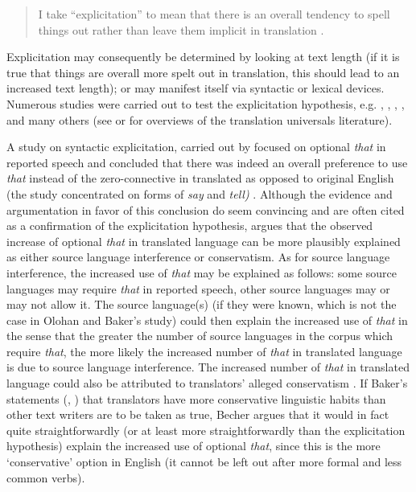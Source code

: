 \begin{quote}
I take “explicitation” to mean that there is an overall tendency to spell things out rather than leave them implicit in translation \citep[180]{baker_corpus-based_1996}.
\end{quote}

Explicitation may consequently be determined by looking at text length (if it is true that things are overall more spelt out in translation, this should lead to an increased text length); or may manifest itself via syntactic or lexical devices. Numerous studies were carried out to test the explicitation hypothesis, e.g. \citet{overas_search_1998}, \citet{olohan_reporting_2000}, \citet{olohan_how_2003}, \citet{mutesayire_apposition_2004}, \citet{mauranen_explicitation_2004} and many others   (see \citet{Kruger2012} or \citet{zanettin_corpus_2013} for overviews of the translation universals literature).

A study on syntactic explicitation, carried out by \citet{olohan_reporting_2000} focused on optional \textit{that} in reported speech and concluded that there was indeed an overall preference to use \textit{that} instead of the zero-connective in translated as opposed to original English (the study concentrated on forms of \textit{say} and \textit{tell)} \citep[157]{olohan_reporting_2000}. Although the evidence and argumentation in favor of this conclusion do seem convincing and are often cited as a confirmation of the explicitation hypothesis, \citet[10-11]{becher_abandoning_2010} argues that the observed increase of optional \textit{that} in translated language can be more plausibly explained as either source language interference or conservatism. As for source language interference, the increased use of \textit{that} may be explained as follows: some source languages may require \textit{that} in reported speech, other source languages may or may not allow it. The source language(s) (if they were known, which is not the case in Olohan and Baker’s study) could then explain the increased use of \textit{that} in the sense that the greater the number of source languages in the corpus which require \textit{that}, the more likely the increased number of \textit{that} in translated language is due to source language interference. The increased number of \textit{that} in translated language could also be attributed to translators’ alleged conservatism \citep{becher_abandoning_2010}. If Baker’s statements (\citeyear[244]{baker_corpus_1993}, \citet[183]{baker_corpus-based_1996}) that translators have more conservative linguistic habits than other text writers are to be taken as true, Becher argues that it would in fact quite straightforwardly (or at least more straightforwardly than the explicitation hypothesis) explain the increased use of optional \textit{that}, since this is the more ‘conservative’ option in English (it cannot be left out after more formal and less common verbs).

